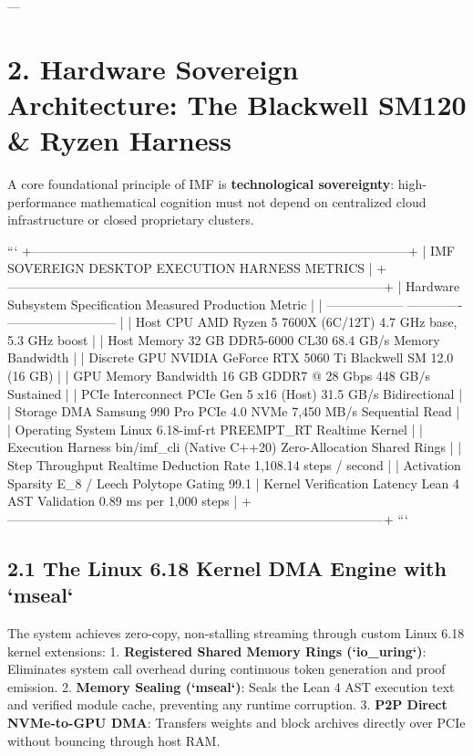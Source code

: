 \documentclass[11pt,twoside,openright]{amsbook}
\begin{document}
---

\section{2. Hardware Sovereign Architecture: The Blackwell SM120 & Ryzen Harness}

A core foundational principle of IMF is \textbf{technological sovereignty}: high-performance mathematical cognition must not depend on centralized cloud infrastructure or closed proprietary clusters.

```
+-----------------------------------------------------------------------------------------+
|                 IMF SOVEREIGN DESKTOP EXECUTION HARNESS METRICS                         |
+-----------------------------------------------------------------------------------------+
|  Hardware Subsystem           Specification                 Measured Production Metric   |
|  ------------------           -------------                 --------------------------   |
|  Host CPU                     AMD Ryzen 5 7600X (6C/12T)    4.7 GHz base, 5.3 GHz boost  |
|  Host Memory                  32 GB DDR5-6000 CL30          68.4 GB/s Memory Bandwidth   |
|  Discrete GPU                 NVIDIA GeForce RTX 5060 Ti    Blackwell SM 12.0 (16 GB)    |
|  GPU Memory Bandwidth         16 GB GDDR7 @ 28 Gbps         448 GB/s Sustained           |
|  PCIe Interconnect            PCIe Gen 5 x16 (Host)         31.5 GB/s Bidirectional      |
|  Storage DMA                  Samsung 990 Pro PCIe 4.0 NVMe 7,450 MB/s Sequential Read   |
|  Operating System             Linux 6.18-imf-rt             PREEMPT_RT Realtime Kernel   |
|  Execution Harness            bin/imf_cli (Native C++20)    Zero-Allocation Shared Rings |
|  Step Throughput              Realtime Deduction Rate       1,108.14 steps / second      |
|  Activation Sparsity          E_8 / Leech Polytope Gating   99.1%
|  Kernel Verification Latency  Lean 4 AST Validation         0.89 ms per 1,000 steps      |
+-----------------------------------------------------------------------------------------+
```

\subsection{2.1 The Linux 6.18 Kernel DMA Engine with `mseal`}
The system achieves zero-copy, non-stalling streaming through custom Linux 6.18 kernel extensions:
1. \textbf{Registered Shared Memory Rings (`io_uring`)}: Eliminates system call overhead during continuous token generation and proof emission.
2. \textbf{Memory Sealing (`mseal`)}: Seals the Lean 4 AST execution text and verified module cache, preventing any runtime corruption.
3. \textbf{P2P Direct NVMe-to-GPU DMA}: Transfers weights and block archives directly over PCIe without bouncing through host RAM.
\end{document}
